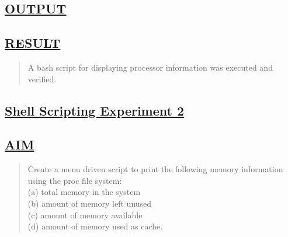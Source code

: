 \documentclass[a4paper, 12pt]{article}
\begin{document}
\newpage
\subsection*{\underline{OUTPUT}}

\begin{figure}[H] 
    \centering
\end{figure}

\begin{figure}[H] 
    \centering
\end{figure}


\subsection*{\underline{RESULT}}
\begin{quote}
A bash script for displaying processor information was executed and verified.
\end{quote}

\newpage
\begin{center}
\section*{\LARGE \textbf{\underline{Shell Scripting Experiment 2}}} %
\end{center}

\subsection*{\underline{AIM}}
\begin{quote}
Create a menu driven script to print the following memory information using the proc file
system:\\
(a) total memory in the system\\
(b) amount of memory left unused\\
(c) amount of memory available\\
(d) amount of memory used as cache.

\end{quote}
\end{document}
